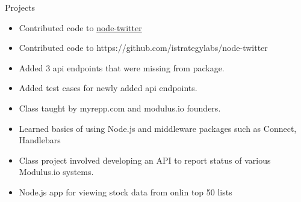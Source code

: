 \begin{category}{Projects}


  \begin{itemize}
    \ifWebLinks
  \item Contributed code to \href{https://github.com/istrategylabs/node-twitter}{node-twitter}
    \else
  \item Contributed code to https://github.com/istrategylabs/node-twitter
    \fi
  \item Added 3 api endpoints that were missing from package.
  \item Added test cases for newly added api endpoints.
  \end{itemize}    
  
\begin{itemize}
\item Class taught by myrepp.com and modulus.io founders.
\item Learned basics of using Node.js and middleware packages such as Connect, Handlebars
\item Class project involved developing an API to report status of various Modulus.io systems.
\end{itemize}

\ifWebLinks
{}
\else
{} 
\fi

\begin{itemize}
\item Node.js app for viewing stock data from onlin top 50 lists


  \ifWebLinks
\end{itemize}
\end{category}
